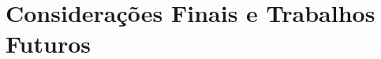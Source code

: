 \chapter{Considerações Finais e Trabalhos \mbox{Futuros}}\label{cap:conclusao}
\thispagestyle{plain}

